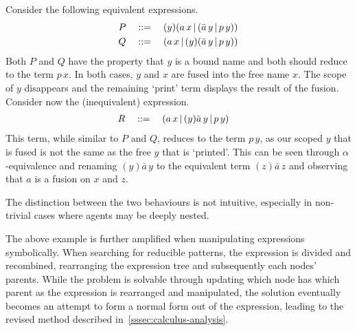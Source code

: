         \begin{example*}
            Consider the following equivalent expressions.
            \begin{align*}
                P \quad & ::= \quad (y)(a \, x \,|\, (\bar{a} \, y \,|\, p \, y)) \\
                Q \quad & ::= \quad (a \, x \,|\, (y)(\bar{a} \, y \,|\, p \, y))
            \end{align*}
            Both $P$ and $Q$ have the property that $y$ is a bound name and both should reduce to the term $p \, x$.
            In both cases, $y$ and $x$ are fused into the free name $x$. The scope of $y$ disappears and the remaining `print' term displays the result of the fusion.
            Consider now the (inequivalent) expression.
            \begin{align*}
                R \quad & ::= \quad (a \, x \, | \, (y)\bar{a} \, y \, | \, p \, y)
            \end{align*}
            This term, while similar to $P$ and $Q$, reduces to the term $p \, y$, as our scoped $y$ that is fused is not the same as the free $y$ that is `printed'.
            This can be seen through $\alpha$-equivalence and renaming $(y)\bar{a} \, y$ to the equivalent term $(z)\bar{a} \, z$ and observing that $a$ is a fusion on $x$ and $z$.

            The distinction between the two behaviours is not intuitive, especially in non-trivial cases where agents may be deeply nested.
        \end{example*}

        The above example is further amplified when manipulating expressions symbolically.
        When searching for reducible patterns, the expression is divided and recombined, rearranging the expression tree and subsequently each nodes' parents.
        While the problem is solvable through updating which node has which parent as the expression is rearranged and manipulated, the solution eventually becomes an attempt to form a normal form out of the expression, leading to the revised method described in~\ref{sssec:calculus-analysis}.
